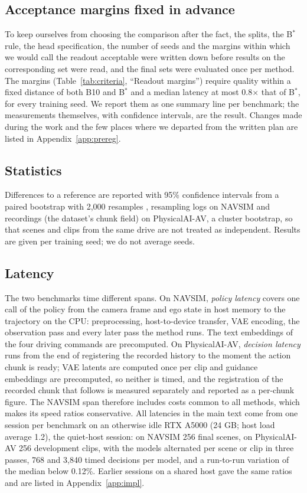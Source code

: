 \documentclass[10pt]{article}
\newcommand{\Bstar}{B$^{*}$}
\begin{document}
\subsection{Acceptance margins fixed in advance}
\label{sec:criteria}

To keep ourselves from choosing the comparison after the fact, the splits, the \Bstar{} rule, the head specification, the number of seeds and the margins within which we would call the readout acceptable were written down before results on the corresponding set were read, and the final sets were evaluated once per method. The margins (Table~\ref{tab:criteria}, ``Readout margins'') require quality within a fixed distance of both B10 and \Bstar{} and a median latency at most 0.8$\times$ that of \Bstar{}, for every training seed. We report them as one summary line per benchmark; the measurements themselves, with confidence intervals, are the result. Changes made during the work and the few places where we departed from the written plan are listed in Appendix~\ref{app:prereg}.

\subsection{Statistics}
\label{sec:stats}

Differences to a reference are reported with 95\% confidence intervals from a paired bootstrap with 2,000 resamples \citep{efron1994bootstrap}, resampling logs on NAVSIM and recordings (the dataset's chunk field) on PhysicalAI-AV, a cluster bootstrap, so that scenes and clips from the same drive are not treated as independent. Results are given per training seed; we do not average seeds.

\subsection{Latency}
\label{sec:latency}

The two benchmarks time different spans. On NAVSIM, \emph{policy latency} covers one call of the policy from the camera frame and ego state in host memory to the trajectory on the CPU: preprocessing, host-to-device transfer, VAE encoding, the observation pass and every later pass the method runs. The text embeddings of the four driving commands are precomputed. On PhysicalAI-AV, \emph{decision latency} runs from the end of registering the recorded history to the moment the action chunk is ready; VAE latents are computed once per clip and guidance embeddings are precomputed, so neither is timed, and the registration of the recorded chunk that follows is measured separately and reported as a per-chunk figure. The NAVSIM span therefore includes costs common to all methods, which makes its speed ratios conservative. All latencies in the main text come from one session per benchmark on an otherwise idle RTX A5000 (24 GB; host load average 1.2), the quiet-host session: on NAVSIM 256 final scenes, on PhysicalAI-AV 256 development clips, with the models alternated per scene or clip in three passes, 768 and 3,840 timed decisions per model, and a run-to-run variation of the median below 0.12\%. Earlier sessions on a shared host gave the same ratios and are listed in Appendix~\ref{app:impl}.
\end{document}
